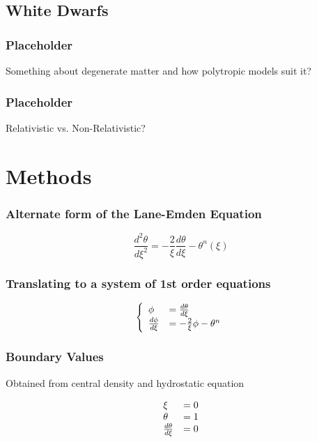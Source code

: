 \documentclass{beamer}
\begin{document}
        \subsection{White Dwarfs}

        \begin{frame}
            \frametitle{Placeholder}

            Something about degenerate matter and how polytropic models suit it?

        \end{frame}

        \begin{frame}
            \frametitle{Placeholder}

            Relativistic vs. Non-Relativistic?

        \end{frame}

    \section{Methods}

        \begin{frame}
            \frametitle{Alternate form of the Lane-Emden Equation}

            \[\frac{d^2\theta}{d\xi^2}=-\frac{2}{\xi}\frac{d\theta}{d\xi}-\theta^n(\xi)\]

        \end{frame}

        \begin{frame}
            \frametitle{Translating to a system of 1st order equations}

            \[
                \left\{ \begin{array}{l l}
                \phi &= \frac{d\theta}{d\xi} \\
                \frac{d\phi}{d\xi} &= -\frac{2}{\xi}\phi - \theta^n
                \end{array} \right.
           \]

        \end{frame}

        \begin{frame}
            \frametitle{Boundary Values}

            Obtained from central density and hydrostatic equation

            \[
                \begin{array}{l l}
                    \xi &= 0 \\
                    \theta &= 1 \\
                    \frac{d\theta}{d\xi} &= 0
                \end{array}
            \]

        \end{frame}
\end{document}
